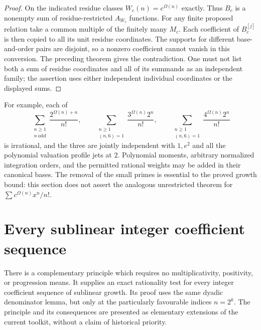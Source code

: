 \begin{proof}
On the indicated residue classes $W_c(n)=c^{\Omega(n)}$ exactly.
Thus $B_c$ is a nonempty sum of residue-restricted $A_{W_c}$ functions.
For any finite proposed relation take a common multiple of the finitely
many $M_c$.  Each coefficient of $B_c^{[j]}$ is then copied to all
its unit residue coordinates.  The supports for different base-and-order
pairs are disjoint, so a nonzero coefficient cannot vanish in this
conversion.  The preceding theorem gives the contradiction.
One must not list both a sum of residue coordinates and all of its
summands as an independent family; the assertion uses either independent
individual coordinates or the displayed sums.
\end{proof}

For example, each of
\[
 \sum_{\substack{n\geq1\\n\ \mathrm{odd}}}
       \frac{2^{\Omega(n)+n}}{n!},\qquad
 \sum_{\substack{n\geq1\\(n,6)=1}}
       \frac{3^{\Omega(n)}2^n}{n!},\qquad
 \sum_{\substack{n\geq1\\(n,6)=1}}
       \frac{4^{\Omega(n)}2^n}{n!}
\]
is irrational, and the three are jointly independent with $1,e^2$
and all the polynomial valuation profile jets at $2$.
Polynomial moments, arbitrary normalized integration orders, and
the permitted rational weights may be added in their canonical bases.
The removal of the small primes is essential to the proved growth
bound: this section does not assert the analogous unrestricted theorem
for $\sum c^{\Omega(n)}x^n/n!$.

\section{Every sublinear integer coefficient sequence}
\label{sec:v5-sublinear}

There is a complementary principle which requires no multiplicativity,
positivity, or progression means.  It supplies an exact rationality test
for every integer coefficient sequence of sublinear growth.  Its proof
uses the same dyadic denominator lemma, but only at the particularly
favourable indices $n=2^k$.  The principle and its consequences are
presented as elementary extensions of the current toolkit, without a
claim of historical priority.

